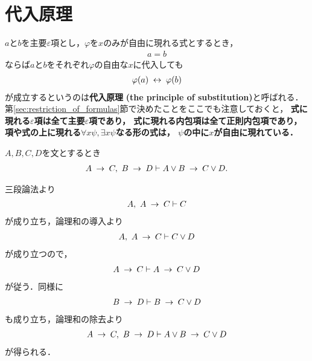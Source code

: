 \section{代入原理}
	$a$と$b$を主要$\varepsilon$項とし，$\varphi$を$x$のみが自由に現れる式とするとき，
	\begin{align}
		a = b
	\end{align}
	ならば$a$と$b$をそれぞれ$\varphi$の自由な$x$に代入しても
	\begin{align}
		\varphi(a) \hspace{0.25em}\leftrightarrow\hspace{0.25em} \varphi(b)
	\end{align}
	が成立するというのは{\bf 代入原理}
	{\bf (the principle of substitution)}と呼ばれる．
	第\ref{sec:restriction_of_formulas}節で決めたことをここでも注意しておくと，
	{\bf 式に現れる$\varepsilon$項は全て主要$\varepsilon$項であり，
	式に現れる内包項は全て正則内包項であり，
	項や式の上に現れる$\forall x \psi,\exists x \psi$なる形の式は，
	$\psi$の中に$x$が自由に現れている．}
	
	\begin{screen}
		\begin{logicalthm}[含意の論理和への遺伝性2]
		\label{logicalthm:heredity_of_implication_to_disjunction_2}
			$A,B,C,D$を文とするとき
			\begin{align}
				A \hspace{0.25em}\rightarrow\hspace{0.25em} C,\ B \hspace{0.25em}\rightarrow\hspace{0.25em} D \vdash A \vee B \hspace{0.25em}\rightarrow\hspace{0.25em} C \vee D.
			\end{align}
		\end{logicalthm}
	\end{screen}
	
	\begin{sketch}
		三段論法より
		\begin{align}
			A,\ A \hspace{0.25em}\rightarrow\hspace{0.25em} C \vdash C
		\end{align}
		が成り立ち，論理和の導入より
		\begin{align}
			A,\ A \hspace{0.25em}\rightarrow\hspace{0.25em} C \vdash C \vee D
		\end{align}
		が成り立つので，
		\begin{align}
			A \hspace{0.25em}\rightarrow\hspace{0.25em} C \vdash A \hspace{0.25em}\rightarrow\hspace{0.25em} C \vee D
		\end{align}
		が従う．同様に
		\begin{align}
			B \hspace{0.25em}\rightarrow\hspace{0.25em} D \vdash B \hspace{0.25em}\rightarrow\hspace{0.25em} C \vee D
		\end{align}
		も成り立ち，論理和の除去より
		\begin{align}
			A \hspace{0.25em}\rightarrow\hspace{0.25em} C,\ B \hspace{0.25em}\rightarrow\hspace{0.25em} D \vdash A \vee B \hspace{0.25em}\rightarrow\hspace{0.25em} C \vee D
		\end{align}
		が得られる．
		\QED
	\end{sketch}
	
